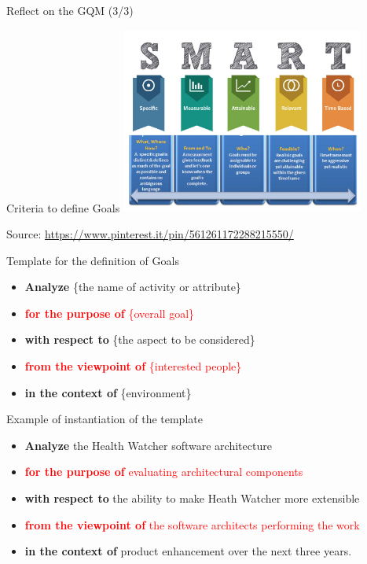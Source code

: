\documentclass{beamer}
\begin{document}
\begin{frame}{\centerline{Reflect on the GQM (3/3)}}

\begin{center}
\Large Criteria to define Goals
\vspace{0.2cm}
\includegraphics[width=80mm]{A2022.IDSEPC.SperimentazioneDeduzione/SMARTGoals.jpeg}
\end{center}

\begin{center}
\tiny
Source:
\url{https://www.pinterest.it/pin/561261172288215550/}
\end{center} 

\end{frame}

\begin{frame}
{\centerline{Template for the definition of Goals}}

\begin{itemize}
\item \textbf{Analyze} \{the name of activity or attribute\}
\item  \textcolor{red}{{\bf for the purpose of} \{overall goal\} }
\item \textbf{with respect to} \{the aspect to be considered\} 
\item \textcolor{red}{{\bf from the viewpoint of} \{interested people\}}
\item  \textbf{in the context of} \{environment\}

\end{itemize}


\end{frame}

\begin{frame}
{\centerline{Example of instantiation of the template}}

\begin{itemize}
\item \textbf{Analyze} the Health Watcher software architecture
\item \textcolor{red}{\textbf{for the purpose of} evaluating architectural components}
\item \textbf{with respect to} the ability to make Heath Watcher more extensible
\item \textcolor{red}{\textbf{from the viewpoint of} the software architects performing the work}
\item \textbf{in the context of} product enhancement over the next three years.

\end{itemize}


\end{frame}
\end{document}
